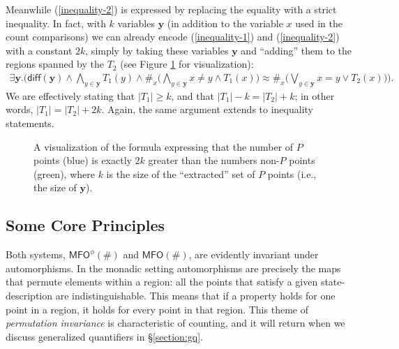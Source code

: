 \documentclass[12pt,oneside,reqno]{amsart}
\theoremstyle{definition}
\begin{document}
Meanwhile (\ref{inequality-2}) is expressed by replacing the equality with a strict inequality. In fact, with $k$ variables $\mathbf{y}$ (in addition to the variable $x$ used in the count comparisons) we can already encode (\ref{inequality-1}) and (\ref{inequality-2}) with a constant $2k$, simply by taking these variables $\mathbf{y}$ and ``adding'' them to the regions spanned by the $T_2$ (see Figure \ref{fig:variables} for visualization):
\begin{eqnarray}
\exists \mathbf{y}.\Big( \mathsf{diff}(\mathbf{y}) \wedge \bigwedge_{y \in \mathbf{y}} T_1(y) \wedge \#_x\big(\bigwedge_{y \in \mathbf{y}} x \neq y \wedge T_1(x)\big) \approx \#_x\big( \bigvee_{y \in \mathbf{y}} x = y \vee T_2(x)\big)\Big). \label{main-inequality}
\end{eqnarray} We are effectively stating that $|T_1| \geq k$, and that $|T_1|-k = |T_2|+k$; in other words, $|T_1| = |T_2|+2k$. Again, the same argument extends to inequality statements.  
\begin{figure} \centering 
    \caption{A visualization of the formula expressing that the number of $P$ points (blue) is exactly $2k$ greater than the numbers non-$P$ points (green), where $k$ is the size of the ``extracted'' set of $P$ points (i.e., the size of $\mathbf{y}$). }\label{fig:variables}
\end{figure}




\subsection{Some Core Principles} \label{section:coreprinciples} Both systems, $\mathsf{MFO}^\phi(\#)$ and $\mathsf{MFO}(\#)$, are evidently invariant under automorphisms. In the monadic setting automorphisms are precisely the maps that permute elements within a region: all the points that satisfy a given state-description are indistinguishable. This means that if a property holds for one point in a region, it holds for every point in that region. This theme of \emph{permutation invariance} is characteristic of counting, and it will return when we discuss generalized quantifiers in \S\ref{section:gq}.
\end{document}
